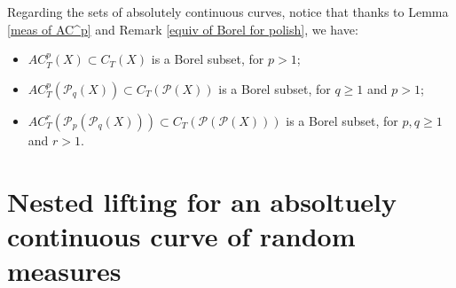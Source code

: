 \documentclass[10pt,leqno]{amsart}
\numberwithin{equation}{section}
\newcommand{\PP}{\mathcal{P}}
\begin{document}
Regarding the sets of absolutely continuous curves, notice that thanks to Lemma \ref{meas of AC^p} and Remark \ref{equiv of Borel for polish}, we have: 
\begin{itemize}
    \item[(viii)] $AC_T^p(X) \subset C_T(X)$ is a Borel subset, for $p>1$;
    \item[(ix)] $AC_T^p(\PP_q(X))\subset C_T(\PP(X))$ is a Borel subset, for $q\geq 1$ and $p>1$;
    \item[(x)] $AC_T^r(\PP_p(\PP_q(X))) \subset C_T(\PP(\PP(X)))$ is a Borel subset, for $p,q\geq 1$ and $r>1$.
\end{itemize}
\section{Nested lifting for an absoltuely continuous curve of random measures}\label{metric structure}
\end{document}
